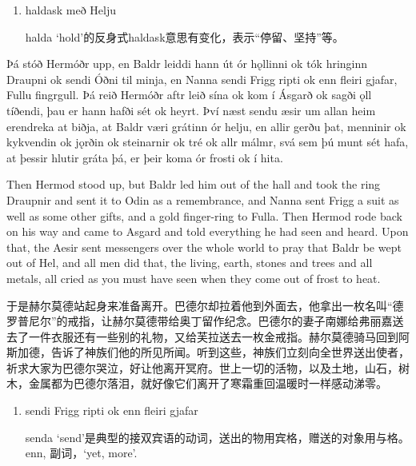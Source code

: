 \begin{grammar*}{}
  \begin{enumerate}[leftmargin=*]
    \item haldask með Helju

          halda `hold'的反身式haldask意思有变化，表示“停留、坚持”等。
  \end{enumerate}
\end{grammar*}
\begin{paracol}{2}
  Þá stóð Hermóðr upp, en Baldr leiddi hann út ór hǫllinni ok tók hringinn Draupni ok sendi Óðni til minja, en Nanna sendi Frigg ripti ok enn fleiri gjafar, Fullu fingrgull. Þá reið Hermóðr aftr leið sína ok kom í Ásgarð ok sagði ǫll tíðendi, þau er hann hafði sét ok heyrt. Því næst sendu æsir um allan heim erendreka at biðja, at Baldr væri grátinn ór helju, en allir gerðu þat, menninir ok kykvendin ok jǫrðin ok steinarnir ok tré ok allr málmr, svá sem þú munt sét hafa, at þessir hlutir gráta þá, er þeir koma ór frosti ok í hita.

  \switchcolumn

  Then Hermod stood up, but Baldr led him out of the hall and took the ring Draupnir and sent it to Odin as a remembrance, and Nanna sent Frigg a suit as well as some other gifts, and a gold finger-ring to Fulla. Then Hermod rode back on his way and came to Asgard and told everything he had seen and heard. Upon that, the Aesir sent messengers over the whole world to pray that Baldr be wept out of Hel, and all men did that, the living, earth, stones and trees and all metals, all cried as you must have seen when they come out of frost to heat.
\end{paracol}
\begin{translation*}{}
  于是赫尔莫德站起身来准备离开。巴德尔却拉着他到外面去，他拿出一枚名叫“德罗普尼尔”的戒指，让赫尔莫德带给奥丁留作纪念。巴德尔的妻子南娜给弗丽嘉送去了一件衣服还有一些别的礼物，又给芙拉送去一枚金戒指。赫尔莫德骑马回到阿斯加德，告诉了神族们他的所见所闻。听到这些，神族们立刻向全世界送出使者，祈求大家为巴德尔哭泣，好让他离开冥府。世上一切的活物，以及土地，山石，树木，金属都为巴德尔落泪，就好像它们离开了寒霜重回温暖时一样感动涕零。
\end{translation*}
\begin{grammar*}{}
  \begin{enumerate}[leftmargin=*]
    \item sendi Frigg ripti ok enn fleiri gjafar

          senda `send'是典型的接双宾语的动词，送出的物用宾格，赠送的对象用与格。enn, 副词，`yet, more'.
  \end{enumerate}
\end{grammar*}
